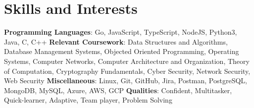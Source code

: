 \documentclass[a4paper,11pt]{article}
\begin{document}
\section{Skills and Interests}
 \begin{itemize}[leftmargin=0.15in, label={}]
    \small{\item{
        \textbf{Programming Languages}{: Go, JavaScript, TypeScript, NodeJS, Python3, Java, C, C++}
        \textbf{Relevant Coursework}{:  Data Structures and Algorithms, Database Management Systems, Objected Oriented Programming, Operating Systems, Computer Networks, Computer Architecture and Organization, Theory of Computation, Cryptography Fundamentals, Cyber Security, Network Security, Web Security}
        \textbf{Miscellaneous}{:  Linux, Git, GitHub, Jira, Postman, PostgreSQL, MongoDB, MySQL, Azure, AWS, GCP}
        \textbf{Qualities}{: Confident, Multitasker, Quick-learner, Adaptive, Team player, Problem Solving}
    }}
 \end{itemize}
 
\vspace{-12pt}
\end{document}
